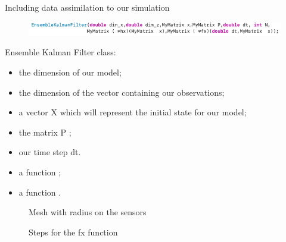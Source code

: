 \begin{frame}[allowframebreaks]{Including data assimilation to our simulation}
\begin{minipage}{1\linewidth}
    \begin{figure}
        \centering
        \includegraphics[width=\linewidth]{"images/enkf/enkf.png"}
    \end{figure}
\end{minipage}
Ensemble Kalman Filter class:
\begin{itemize}
    \item the dimension of our model;
    \item the dimension of the vector containing our observations;
    \item a vector X which will represent the initial state for our model;
    \item the matrix P ;
    \item our time step dt. 
    \item a function ;
    \item a function .

\end{itemize}
\newpage
\begin{minipage}{0.4\hsize}
			\centering
		\begin{figure}[H]
		\caption{Mesh with radius on the sensors}
	\end{figure}
		\end{minipage} \quad
		\begin{minipage}{0.4\hsize}
		\begin{figure}[H]
		\caption{Steps for the fx function}
		\end{figure}
		\end{minipage}



\end{frame}




